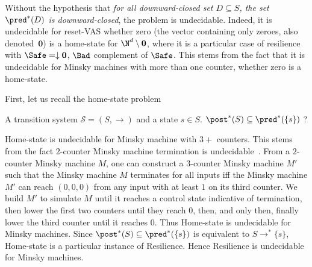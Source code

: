 Without the hypothesis that
{\em for all downward-closed set $D \subseteq S$, the set $\pred^*(D)$ is downward-closed}, the problem is undecidable.
 Indeed, it is 
undecidable for reset-VAS whether zero (the vector containing only zeroes, also denoted~$ \textbf{0}$) is a home-state for $\N^d \setminus \textbf{0}$, where it is a particular case of resilience with $\Safe = \downarrow \textbf{0}$, $\Bad$ complement of $\Safe$. This stems from the fact that it is undecidable for Minsky machines with more than one counter, whether zero is a home-state. %



First, let us recall the home-state problem

{A transition system $\mathscr{S}=(S,\rightarrow)$ and a state $s \in S$.}
{$\post^*(S) \subseteq \pred^*(\{s\})$ ?\newline}



Home-state is undecidable for Minsky machine with $3+$ counters.
This stems from the fact $2$-counter Minsky machine termination is undecidable~\cite{Min61,Min67}.
From a $2$-counter Minsky machine $M$, one can construct a $3$-counter Minsky machine $M'$ 
such that the Minsky machine $M$ terminates for all inputs iff the Minsky machine $M'$ can reach $(0,0,0)$ from any input with at least $1$ on its third counter. We build $M'$ to simulate $M$ until it reaches a control state indicative of termination, then lower the first two counters until they reach $0$, then, and only then, finally lower the third counter until it reaches $0$.
Thus {\sc Home-state} is undecidable for Minsky machines. Since $\post^*(S) \subseteq \pred^*(\{s\})$ is equivalent to $S \rightarrow^* \{s\}$,  {\sc Home-state} is a particular instance of {\sc Resilience}. Hence {\sc Resilience} is undecidable for Minsky machines.


